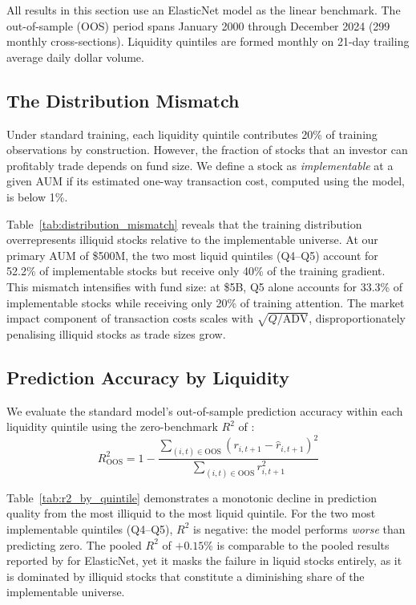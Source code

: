 \documentclass[a4paper,12pt,final]{article}
\begin{document}
All results in this section use an ElasticNet model \citep{zou2005regularization} as the linear benchmark. The out-of-sample (OOS) period spans January 2000 through December 2024 (299 monthly cross-sections). Liquidity quintiles are formed monthly on 21-day trailing average daily dollar volume.

\subsection{The Distribution Mismatch}
\label{subsec:mismatch}

Under standard training, each liquidity quintile contributes 20\% of training observations by construction. However, the fraction of stocks that an investor can profitably trade depends on fund size. We define a stock as \emph{implementable} at a given AUM if its estimated one-way transaction cost, computed using the \citet{frazzini2018trading} model, is below 1\%.



Table~\ref{tab:distribution_mismatch} reveals that the training distribution overrepresents illiquid stocks relative to the implementable universe. At our primary AUM of \$500M, the two most liquid quintiles (Q4--Q5) account for 52.2\% of implementable stocks but receive only 40\% of the training gradient. This mismatch intensifies with fund size: at \$5B, Q5 alone accounts for 33.3\% of implementable stocks while receiving only 20\% of training attention. The market impact component of transaction costs scales with $\sqrt{Q/\text{ADV}}$, disproportionately penalising illiquid stocks as trade sizes grow.

\subsection{Prediction Accuracy by Liquidity}
\label{subsec:prediction_accuracy}

We evaluate the standard model's out-of-sample prediction accuracy within each liquidity quintile using the zero-benchmark $R^2$ of \citet{gu2020empirical}:
\begin{equation}
R^2_{\text{OOS}} = 1 - \frac{\sum_{(i,t) \in \text{OOS}} (r_{i,t+1} - \hat{r}_{i,t+1})^2}{\sum_{(i,t) \in \text{OOS}} r_{i,t+1}^2}
\label{eq:oos_r2}
\end{equation}



Table~\ref{tab:r2_by_quintile} demonstrates a monotonic decline in prediction quality from the most illiquid to the most liquid quintile. For the two most implementable quintiles (Q4--Q5), $R^2$ is negative: the model performs \emph{worse} than predicting zero. The pooled $R^2$ of $+0.15\%$ is comparable to the pooled results reported by \citet{gu2020empirical} for ElasticNet, yet it masks the failure in liquid stocks entirely, as it is dominated by illiquid stocks that constitute a diminishing share of the implementable universe.
\end{document}
